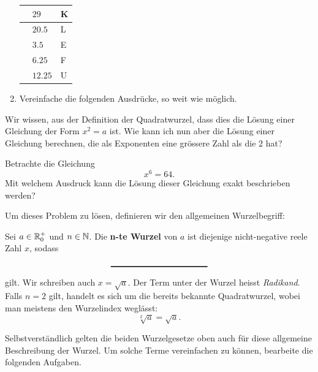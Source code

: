 \documentclass[11pt,oneside]{article}
\begin{document}
\begin{aufgabe}
\begin{enumerate}
\begin{table}[H]
\begin{tabularx}{0.8\textwidth}{| >{\raggedright\arraybackslash}X | >{\centering\arraybackslash}X | >{\centering\arraybackslash}X | }
					& $29$ & K \\\cline{2-3}
					& $20.5$ & L \\\hline\hline
					\multirow{3}{4em}{$\sqrt{12+\frac{1}{4}}=$} & $3.5$ & E \\\cline{2-3}
					& $6.25$ & F \\\cline{2-3}
					& $12.25$ & U \\\hline
				\end{tabularx}
			\end{table}
			\endgroup
			\item Vereinfache die folgenden Ausdrücke, so weit wie möglich.
		\end{enumerate}
	\end{aufgabe}
	Wir wissen, aus der Definition der Quadratwurzel, dass dies die Lösung einer Gleichung der Form $x^2=a$ ist. Wie kann ich nun aber die Lösung einer Gleichung berechnen, die als Exponenten eine grössere Zahl als die $2$ hat?
	\begin{beispiel}
		Betrachte die Gleichung \[x^6=64.\] Mit welchem Ausdruck kann die Lösung dieser Gleichung exakt beschrieben werden?\vspace{5pt}\newline{}
	\end{beispiel}
	Um dieses Problem zu lösen, definieren wir den allgemeinen Wurzelbegriff:
	\begin{definition}[n-te Wurzel]
		Sei $a\in\mathbb{R}_0^+$ und $n\in\mathbb{N}$. Die \textbf{n-te Wurzel} von $a$ ist diejenige nicht-negative reele Zahl $x$, sodass \[\gap{4}\] gilt. Wir schreiben auch $x=\sqrt{a}$. Der Term unter der Wurzel heisst \textit{Radikand}.
		Falls $n=2$ gilt, handelt es sich um die bereits bekannte Quadratwurzel, wobei man meistens den Wurzelindex weglässt: \[\sqrt[2]{a}=\sqrt{a}.\]
	\end{definition}
	Selbstverständlich gelten die beiden Wurzelgesetze oben auch für diese allgemeine Beschreibung der Wurzel. Um solche Terme vereinfachen zu können, bearbeite die folgenden Aufgaben.
\end{document}
